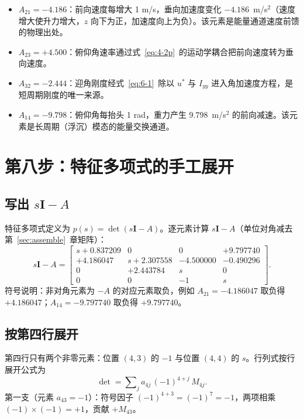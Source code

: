 \documentclass[11pt,a4paper]{ctexart}
\begin{document}
\begin{itemize}[itemsep=2pt]
  \item $A_{21}=-4.186$：前向速度每增大 1 m/s，垂向加速度变化 $-4.186$~m/s$^2$（速度增大使升力增大，$z$ 向下为正，加速度向上为负）。该元素是能量通道速度前馈的物理出处。
  \item $A_{23}=+4.500$：俯仰角速率通过式~\eqref{eq:4-2p}~的运动学耦合把前向速度转为垂向速度。
  \item $A_{32}=-2.444$：迎角刚度经式~\eqref{eq:6-1}~除以 $u^{*}$ 与 $I_{yy}$ 进入角加速度方程，是短周期刚度的唯一来源。
  \item $A_{14}=-9.798$：俯仰角每抬头 1 rad，重力产生 $9.798$~m/s$^2$ 的前向减速。该元素是长周期（浮沉）模态的能量交换通道。
\end{itemize}

\section{第八步：特征多项式的手工展开}\label{sec:charpoly}

\subsection{写出 \texorpdfstring{$s\mathbf{I}-A$}{sI-A}}

特征多项式定义为 $p(s)=\det(s\mathbf{I}-A)$。逐元素计算 $s\mathbf{I}-A$（单位对角减去第~\ref{sec:assemble}~章矩阵）：
\begin{equation}\label{eq:sIA}
s\mathbf{I}-A =
\begin{bmatrix}
s+0.837209 & 0 & 0 & +9.797740 \\
+4.186047 & s+2.307558 & -4.500000 & -0.490296 \\
0 & +2.443784 & s & 0 \\
0 & 0 & -1 & s
\end{bmatrix}.
\tag{(8-0)}
\end{equation}
符号说明：非对角元素为 $-A$ 的对应元素取负，例如 $A_{21}=-4.186047$ 取负得 $+4.186047$；$A_{14}=-9.797740$ 取负得 $+9.797740$。

\subsection{按第四行展开}

第四行只有两个非零元素：位置 $(4,3)$ 的 $-1$ 与位置 $(4,4)$ 的 $s$。行列式按行展开公式为
\[
\det = \sum\nolimits_j a_{4j}\,(-1)^{4+j}\,M_{4j}.
\]
第一支（元素 $a_{43}=-1$）：符号因子 $(-1)^{4+3}=(-1)^{7}=-1$，两项相乘 $(-1)\times(-1)=+1$，贡献 $+M_{43}$。
\end{document}
